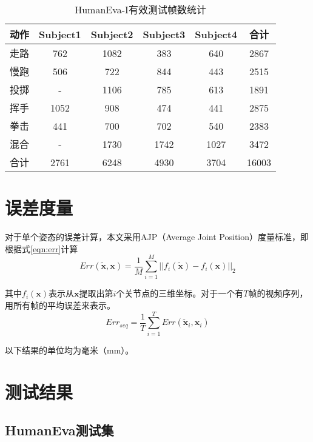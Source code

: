 \begin{table}[H]
  \centering
  \caption{HumanEva-I有效测试帧数统计}
  \label{tab:validframes}
    \begin{tabular}{lccccc}
      \toprule[1.5pt]
      动作 & Subject1 & Subject2 & Subject3 & Subject4 & 合计 \\\midrule[1pt]
      走路 & 762 & 1082 & 383 & 640 & 2867\\
      慢跑 & 506 & 722 & 844 & 443 & 2515\\
      投掷 & - & 1106 & 785 & 613 & 1891\\
      挥手 & 1052 & 908 & 474 & 441 & 2875\\
      拳击 & 441 & 700 & 702 & 540 & 2383\\
      混合 & -& 1730& 1742 & 1027& 3472\\
      合计 &  2761& 6248 & 4930 & 3704& 16003\\
      \bottomrule[1.5pt]
    \end{tabular}
\end{table}

\section{误差度量}
对于单个姿态的误差计算，本文采用AJP（Average Joint Position）度量标准，即根据式\ref{eqn:err}计算
\begin{equation}
  Err(\widetilde{\mathbf{x}},\mathbf{x}) = \frac{1}{M}\sum^M_{i=1}||f_i(\widetilde{\mathbf{x}})-f_i(\mathbf{x})||_2  \label{eqn:err}
\end{equation}

其中$f_i(\mathbf{x})$表示从$\mathbf{x}$提取出第$i$个关节点的三维坐标。对于一个有$T$帧的视频序列，用所有帧的平均误差来表示。
\begin{equation}
  Err_{seq} = \frac{1}{T}\sum^T_{i=1}Err(\widetilde{\mathbf{x}}_i,\mathbf{x}_i)
\end{equation}

以下结果的单位均为毫米（mm）。

\section{测试结果}
\subsection{HumanEva测试集}

